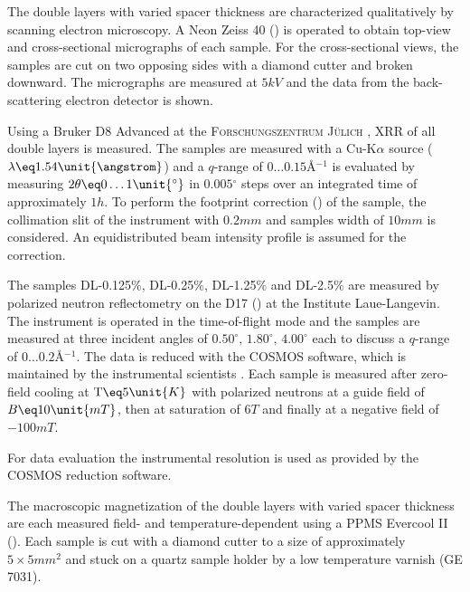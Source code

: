\documentclass[\main/dresen_thesis.tex]{subfiles}
\begin{document}
    The double layers with varied spacer thickness are characterized qualitatively by scanning electron microscopy.
    A Neon Zeiss 40 () is operated to obtain top-view and cross-sectional micrographs of each sample.
    For the cross-sectional views, the samples are cut on two opposing sides with a diamond cutter and broken downward.
    The micrographs are measured at $5 \unit{kV}$ and the data from the back-scattering electron detector is shown.

    Using a Bruker D8 Advanced at the \textsc{Forschungszentrum J\"ulich} , XRR of all double layers is measured.
    The samples are measured with a Cu-K$\alpha$ source ($\lambda \eq 1.54 \unit{\angstrom}$) and a $q$-range of $0 \ldots 0.15 \unit{\angstrom^{-1}}$ is evaluated by measuring $2 \theta \eq 0 \ldots 1 \unit{^\circ}$ in $0.005 \unit{^\circ}$ steps over an integrated time of approximately $1 \unit{h}$.
    To perform the footprint correction () of the sample, the collimation slit of the instrument with $0.2 \unit{mm}$ and samples width of $10 \unit{mm}$ is considered.
    An equidistributed beam intensity profile is assumed for the correction.

    The samples DL-0.125\%, DL-0.25\%, DL-1.25\% and DL-2.5\% are measured by polarized neutron reflectometry on the D17 () at the Institute Laue-Langevin.
    The instrument is operated in the time-of-flight mode and the samples are measured at three incident angles of $0.50^\circ ,\, 1.80^\circ ,\, 4.00^\circ$ each to discuss a $q$-range of $0 \ldots 0.2 \unit{\angstrom^{-1}}$.
    The data is reduced with the COSMOS software, which is maintained by the instrumental scientists \cite{Gutfreund_2018_Towar}.
    Each sample is measured after zero-field cooling at $\mathrm{T} \eq 5 \unit{K}$ with polarized neutrons at a guide field of $B \eq 10 \unit{mT}$, then at saturation of $6 \unit{T}$ and finally at a negative field of $-100 \unit{mT}$.

    For data evaluation the instrumental resolution is used as provided by the COSMOS reduction software.

    The macroscopic magnetization of the double layers with varied spacer thickness are each measured field- and temperature-dependent using a PPMS Evercool II ().
    Each sample is cut with a diamond cutter to a size of approximately $5 \times 5 \unit{mm^2}$ and stuck on a quartz sample holder by a low temperature varnish (GE 7031).
\end{document}
